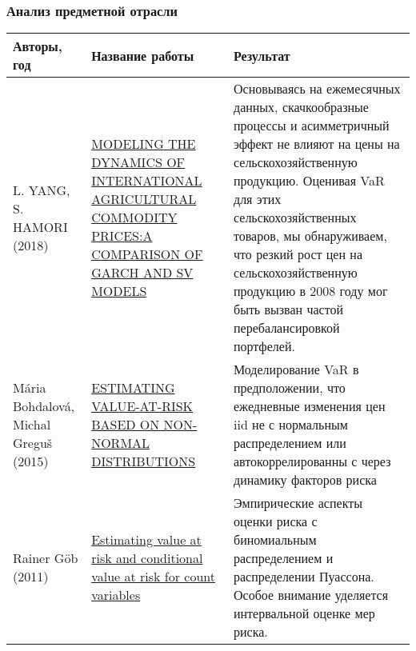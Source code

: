 \documentclass[c, dvipsnames]{beamer}  %
\begin{document}
\begin{frame}[shrink=5]
\frametitle{Анализ предметной отрасли} 


	
	\begin{table} \small\centering\setlength{\extrarowheight}{0.25em}
		
		\begin{tabular}{   >{\centering\footnotesize}p{5.5em} 
				>{\centering\footnotesize}p{10em}
				>{\centering\footnotesize\arraybackslash}p{20em} }\hline
			
			
			
			Авторы, год & Название работы &  Результат \\\hline 
			
			
			L. YANG, S. HAMORI (2018) & \href{https://www.worldscientific.com/doi/abs/10.1142/S2010495218500100}{MODELING THE DYNAMICS OF INTERNATIONAL AGRICULTURAL COMMODITY PRICES:A COMPARISON OF GARCH AND SV MODELS}  &    Основываясь на ежемесячных данных, скачкообразные процессы и асимметричный эффект не влияют на цены на сельскохозяйственную продукцию. Оценивая VaR для этих сельскохозяйственных товаров, мы обнаруживаем, что резкий рост цен на сельскохозяйственную продукцию в 2008 году мог быть вызван частой перебалансировкой портфелей. \\
			
			  Mária Bohdalová, Michal Greguš (2015) & \href{https://www.researchgate.net/publication/283243124_ESTIMATING_VALUE-AT-RISK_BASED_ON_NON-NORMAL_DISTRIBUTIONS}{ESTIMATING VALUE-AT-RISK BASED ON NON-NORMAL DISTRIBUTIONS}  &    Моделирование VaR в предположении, что ежедневные изменения цен iid не с нормальным распределением или   автокоррелированны  с через  динамику факторов риска \\
			
			
			
			Rainer Göb (2011) & \href{https://onlinelibrary.wiley.com/doi/abs/10.1002/qre.1238}{Estimating value at risk and conditional value at risk for count variables}  &    Эмпирические аспекты оценки риска с биномиальным распределением и распределении Пуассона. Особое внимание уделяется интервальной оценке мер риска.  \\\hline
			



			
		\end{tabular}
	\end{table}


\end{frame}
\end{document}
